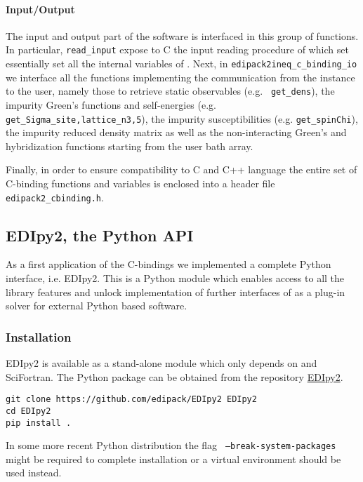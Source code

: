 \documentclass[edipack2.tex]{subfiles}
\begin{document}
\paragraph{{\bf Input/Output}}
The input and output part of the software is interfaced in this group
of functions. In particular, {\tt read\_input} expose to C the input
reading procedure of \NAME which set essentially set all the internal
variables of \NAME.
Next, in {\tt edipack{2ineq}\_c\_binding\_io} we interface all the
functions implementing the communication from the \NAME instance to
the user, namely those to retrieve static observables (e.g. {\tt
  get\_dens}), the impurity Green's functions and self-energies
(e.g. {\tt get\_Sigma\_{site,lattice}\_n{3,5}}), the
impurity susceptibilities (e.g. {\tt get\_spinChi}), the impurity reduced density matrix as well
as the non-interacting Green's and hybridization functions starting from the
user bath array.   


Finally, in order to ensure compatibility to C and C++ language the
entire set of C-binding functions and variables is enclosed into a
header file {\tt edipack2\_cbinding.h}. 
 





\subsection{EDIpy2, the Python API}\label{sSecInteropEDIpy}
As a first application of the \NAME C-bindings we implemented a
complete Python interface, i.e. EDIpy2. This is a Python module which
enables access to all the library features and unlock implementation of
further interfaces of \NAME as a plug-in solver for external Python
based software.    


\subsubsection{Installation}\label{sSecInteropEDIpyInstallation}
EDIpy2 is available as a stand-alone
module which only depends on \NAME and SciFortran.
The Python package can be obtained from the repository
\href{https://github.com/EDIpack/EDIpy2.0}{EDIpy2}.

\begin{lstlisting}[style=mybash]
git clone https://github.com/edipack/EDIpy2 EDIpy2
cd EDIpy2
pip install . 
\end{lstlisting}
In some more recent Python distribution the flag {\tt
  --break-system-packages} might be required to complete
installation or a virtual environment should be used instead. 
\end{document}
